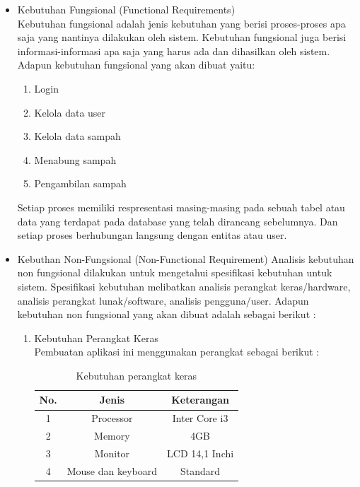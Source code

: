 \begin{itemize}
\item Kebutuhan Fungsional (Functional Requirements)
\hfill\\
Kebutuhan fungsional adalah jenis kebutuhan yang berisi proses-proses apa saja yang nantinya dilakukan oleh sistem. Kebutuhan fungsional juga berisi informasi-informasi apa saja yang harus ada dan dihasilkan oleh sistem.
Adapun kebutuhan fungsional yang akan dibuat yaitu:
	\begin{enumerate}
		\item Login
		\item Kelola data user
		\item Kelola data sampah
		\item Menabung sampah
		\item Pengambilan sampah
	\end{enumerate}
Setiap proses memiliki respresentasi masing-masing pada sebuah tabel atau data yang terdapat pada database yang telah dirancang sebelumnya. Dan setiap proses berhubungan langsung dengan entitas atau user.

\item Kebuthan Non-Fungsional (Non-Functional Requirement)
Analisis kebutuhan non fungsional dilakukan untuk mengetahui spesifikasi kebutuhan untuk sistem. Spesifikasi kebutuhan melibatkan analisis perangkat keras/hardware, analisis perangkat lunak/software, analisis pengguna/user.
Adapun kebutuhan non fungsional yang akan dibuat adalah sebagai berikut :
	
	\begin{enumerate}
		\item Kebutuhan Perangkat Keras
		\hfill\\
		Pembuatan aplikasi ini menggunakan perangkat sebagai berikut :
\begin{table}[H]
\caption{Kebutuhan perangkat keras}
\centering
\begin{tabular}{c c c}
\hline \hline
No. & Jenis & Keterangan \\ [0.5ex]
\hline
1 & Processor & Inter Core i3 \\
2 & Memory & 4GB \\
3 & Monitor & LCD 14,1 Inchi \\
4 & Mouse dan keyboard & Standard \\ [1ex]
\hline
\end{tabular}
\label{tabel:nonlin}
\end{table}				
		

\end{enumerate}
\end{itemize}
